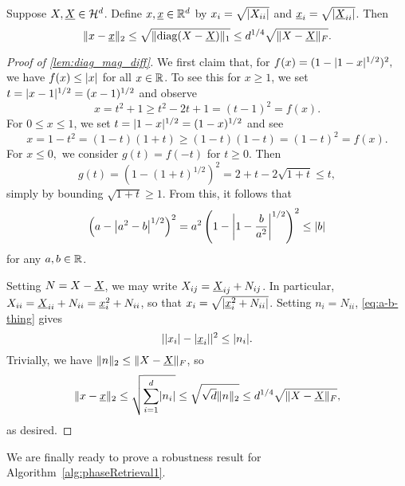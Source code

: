 \begin{lemma} \label{lem:diag_mag_diff}
  Suppose $X, \uX \in \H^d$. Define $x, \ux \in \R^d$ by $x_i = \sqrt{\abs{X_{ii}}}$ and $\ux_i = \sqrt{\abs{\uX_{ii}}}$.  Then \[\norm{x - \ux}_2 \le \sqrt{\norm{\diag(X - \uX)}_1} \le d^{1/ 4} \sqrt{\norm{X - \uX}_F}.\]
\end{lemma}

\begin{proof}[Proof of \cref{lem:diag_mag_diff}]
  We first claim that, for $f(x) = (1 - \abs{1 - x}^{1 / 2})^2,$ we have $f(x) \le \abs{x}$ for all $x \in \R$.  To see this for $x \ge 1$, we set $t = \abs{x - 1}^{1/2} = (x - 1)^{1/2}$ and observe \[x = t^2 + 1 \ge t^2 - 2t + 1 = (t - 1)^2 = f(x).\]  For $0 \le x \le 1$, we set $t = \abs{1 - x}^{1 / 2} = (1 - x)^{1 / 2}$ and see \[x = 1 - t^2 = (1 - t) (1 + t) \ge (1 - t) (1 - t) = (1 - t)^2 = f(x).\]  For $x \le 0,$ we consider $g(t) = f(-t)$ for $t \ge 0$.  Then \[g(t) = (1 - (1 + t)^{1 / 2})^2 = 2 + t - 2\sqrt{1 + t} \le t,\] simply by bounding $\sqrt{1 + t} \ge 1$.  From this, it follows that \begin{equation} \left(a - \abs*{a^2 - b}^{1 / 2}\right)^2 = a^2 \left(1 - \abs*{1 - \frac{b}{a^2}}^{1 / 2}\right)^2 \le \abs{b} \label{eq:a-b-thing} \end{equation} for any $a, b \in \R$.
  
  Setting $N = X - \uX$, we may write $X_{ij} = \uX_{ij} + N_{ij}$.  In particular, $X_{ii} = \uX_{ii} + N_{ii} = \ux_i^2 + N_{ii}$, so that $x_i = \sqrt{\abs{\ux_i^2 + N_{ii}}}$.  Setting $n_i = N_{ii}$, \eqref{eq:a-b-thing} gives \[\abs{\abs{x_i} - \abs{\ux_i}}^2 \le \abs{n_i}.\]  Trivially, we have $\norm{n}_2 \le \norm{X - \uX}_F$, so \[\norm{x - \ux}_2 \le \sqrt{\sum_{i = 1}^d \abs{n_i}} \le \sqrt{\sqrt{d} \norm{n}_2} \le d^{1 / 4} \sqrt{\norm{X - \uX}_F},\] as desired.
\end{proof}

We are finally ready to prove a robustness result for Algorithm~\ref{alg:phaseRetrieval1}.

